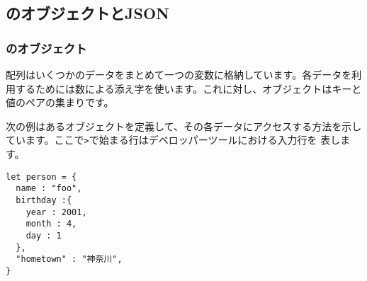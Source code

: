 \ifSeminor\else
\subsection{\JS のオブジェクトとJSON}
\subsubsection{\JS のオブジェクト}
配列はいくつかのデータをまとめて一つの変数に格納しています。各データを利
用するためには数による添え字を使います。これに対し、オブジェクトはキーと
値のペアの集まりです。

次の例はあるオブジェクトを定義して、その各データにアクセスする方法を示し
ています。ここで\texttt{>}で始まる行はデベロッパーツールにおける入力行を
表します。
\begin{Verbatim}
let person = {
  name : "foo",
  birthday :{
    year : 2001,
    month : 4,
    day : 1
  },
  "hometown" : "神奈川",
}
\end{Verbatim}
